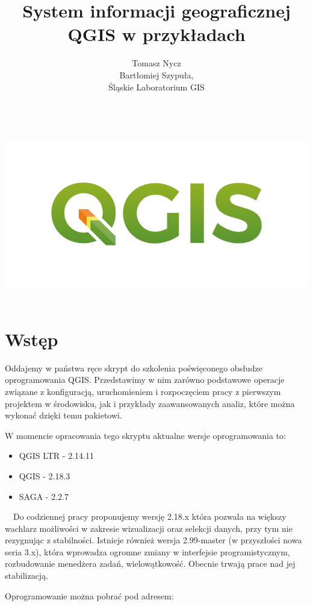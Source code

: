 \documentclass[12pt,a4paper]{book}
\begin{document}
\frontmatter
\includegraphics[width=15.949cm,height=7.645cm]{logo-qgis3}	
\title{System informacji geograficznej QGIS w przykładach}
\author{Tomasz Nycz \\Bartłomiej Szypuła, \\Śląskie Laboratorium GIS}
\date{}
\maketitle


\chapter{Wstęp}
Oddajemy w państwa ręce skrypt do szkolenia poświęconego obsłudze oprogramowania QGIS. Przedstawimy w nim zarówno podstawowe operacje związane z konfiguracją, uruchomieniem i rozpoczęciem pracy z pierwszym projektem w środowisku, jak i przykłady zaawansowanych analiz, które można wykonać dzięki temu pakietowi.

W momencie opracowania tego skryptu aktualne wersje oprogramowania to:
\begin{itemize}
\item QGIS LTR - 2.14.11
\item QGIS - 2.18.3
\item SAGA - 2.2.7
\end{itemize}
\ \ Do codziennej pracy proponujemy wersję 2.18.x która pozwala na większy wachlarz możliwości w zakresie wizualizacji oraz selekcji danych, przy tym nie rezygnując z stabilności. Istnieje również wersja 2.99-master (w przyszłości nowa seria 3.x), która wprowadza ogromne zmiany w interfejsie programistycznym, rozbudowanie menedżera zadań, wielowątkowość. Obecnie trwają prace nad jej stabilizacją.

Oprogramowanie można pobrać pod adresem:
\end{document}
